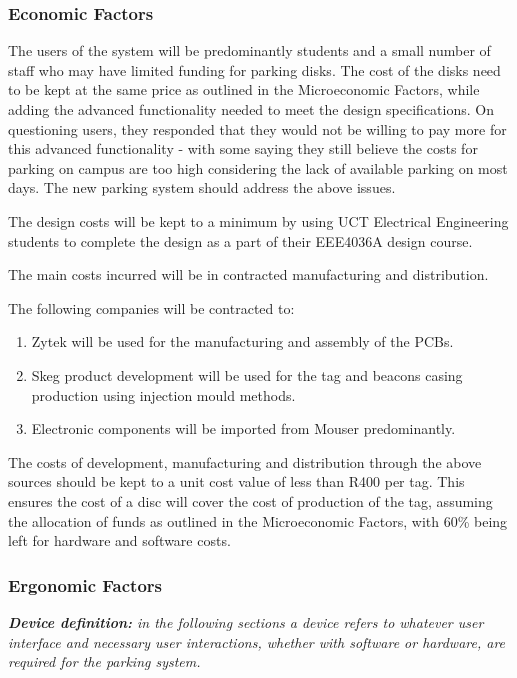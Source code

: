 \subsubsection{Economic Factors}
The users of the system will be predominantly students and a small number of staff who may have limited funding for parking disks. The cost of the disks need to be kept at the same price as outlined in the Microeconomic Factors, while adding the advanced functionality needed to meet the design specifications. On questioning users, they responded that they would not be willing to pay more for this advanced functionality - with some saying they still believe the costs for parking on campus are too high considering the lack of available parking on most days. The new parking system should address the above issues.

The design costs will be kept to a minimum by using UCT Electrical Engineering students to complete the design as a part of their EEE4036A design course.

The main costs incurred will be in contracted manufacturing and distribution. 

The following companies will be contracted to:
\begin{enumerate}
\item Zytek will be used for the manufacturing and assembly of the PCBs.
\item Skeg product development will be used for the tag and beacons casing production using injection mould methods.
\item Electronic components will be imported from Mouser predominantly. 
\end{enumerate}

The costs of development, manufacturing and distribution through the above sources should be kept to a unit cost value of less than R400 per tag. This ensures the cost of a disc will cover the cost of production of the tag, assuming  the allocation of funds as outlined in the Microeconomic Factors, with 60\% being left for hardware and software costs.

\subsubsection{Ergonomic Factors}
\textit{\textbf{Device definition:} in the following sections a device refers to whatever user interface and necessary user interactions, whether with software or hardware, are required for the parking system.}


